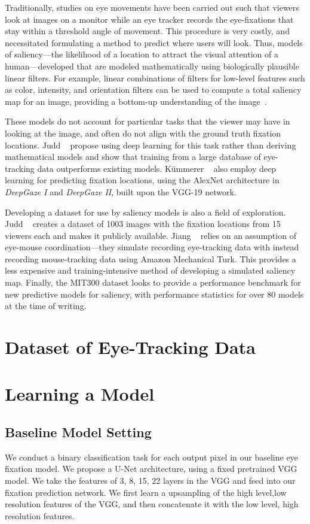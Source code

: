 \documentclass[10pt,twocolumn,letterpaper]{article}
\begin{document}
Traditionally, studies on eye movements have been carried out such that
viewers look at images on a monitor while an eye tracker records the
eye-fixations that stay within a threshold angle of movement. This procedure is
very costly, and necessitated formulating a method to predict where users will
look. Thus, models of saliency---the likelihood of a location to attract the
visual attention of a human---developed that are modeled mathematically using
biologically plausible linear filters. For example, linear combinations of
filters for low-level features such as color, intensity, and orientation
filters can be used to compute a total saliency map for an image,
providing a bottom-up understanding of the image~\cite{Itti}.

These models do not account for particular tasks that the viewer may have in
looking at the image, and often do not align with the ground truth fixation
locations. Judd \etal~\cite{Judd} propose using deep learning for this task
rather than deriving mathematical models and show that training from a large
database of eye-tracking data outperforms existing models. K\"ummerer
\etal~\cite{Kummerer} also employ deep learning for predicting fixation
locations, using the AlexNet architecture in \textit{DeepGaze I} and \textit{DeepGaze II}, built upon the VGG-19 network.

Developing a dataset for use by saliency models is also a field of exploration.
Judd \etal~\cite{Judd} creates a dataset of 1003 images with the fixation
locations from 15 viewers each and makes it publicly available. Jiang
\etal~\cite{Jiang} relies on an assumption of eye-mouse coordination---they
simulate recording eye-tracking data with instead recording mouse-tracking data
using Amazon Mechanical Turk. This provides a less expensive and
training-intensive method of developing a simulated saliency map. Finally, the
MIT300 dataset \cite{mitbench} looks to provide a performance benchmark for new predictive
models for saliency, with performance statistics for over 80 models at the time
of writing. 


\section{Dataset of Eye-Tracking Data}
\section{Learning a Model}
\subsection{Baseline Model Setting}
We conduct a binary classification task for each output pixel in our baseline eye fixation model. We propose a U-Net architecture, using a fixed pretrained VGG model. We take the features of 3, 8, 15, 22 layers in the VGG and feed into our fixation prediction network. We first learn a upsampling of the high level,low resolution features of the VGG, and then concatenate it with the low level, high resolution features.
\end{document}

